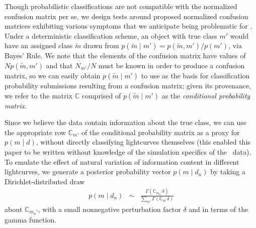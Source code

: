 Though probabilistic classifications are not compatible with the normalized confusion matrix per se, we design tests around proposed normalized confusion matrices exhibiting various symptoms that we anticipate being problematic for \lsst.
Under a deterministic classification scheme, an object with true class $m'$ would have an assigned class $\tilde{m}$ drawn from $p(\tilde{m} \mid m') = p(\tilde{m}, m') / p(m')$, via Bayes' Rule.
We note that the elements of the confusion matrix have values of $N p(\tilde{m}, m')$ and that $N_{m'} / N$ must be known in order to produce a confusion matrix, so we can easily obtain $p(\tilde{m} \mid m')$ to use as the basis for classification probability submissions resulting from a confusion matrix; given its provenance, we refer to the matrix $\mathbb{C}$ comprised of $p(\tilde{m} \mid m')$ as the \textit{conditional probability matrix}.

Since we believe the data contain information about the true class, we can use the appropriate row $\mathbb{C}_{m'}$ of the conditional probability matrix as a proxy for $p(m \mid d)$, without directly classifying lightcurves themselves (this enabled this paper to be written without knowledge of the simulation specifics of the \plasticc\ data). To emulate the effect of natural variation of information content in different lightcurves, we generate a posterior probability vector $p(m \mid d_{n})$ by taking a Dirichlet-distributed draw
\begin{eqnarray}
  \label{eq:cmtoprob}
  p(m \mid d_{n}) &\sim& \frac{\Gamma(\mathbb{C}_{m_{n}'} \delta)}{\sum_{m'} \Gamma(\mathbb{C}_{m'} \delta)}
\end{eqnarray}
about $\mathbb{C}_{m_{n}'}$, with a small nonnegative perturbation factor $\delta$ and in terms of the gamma function.

